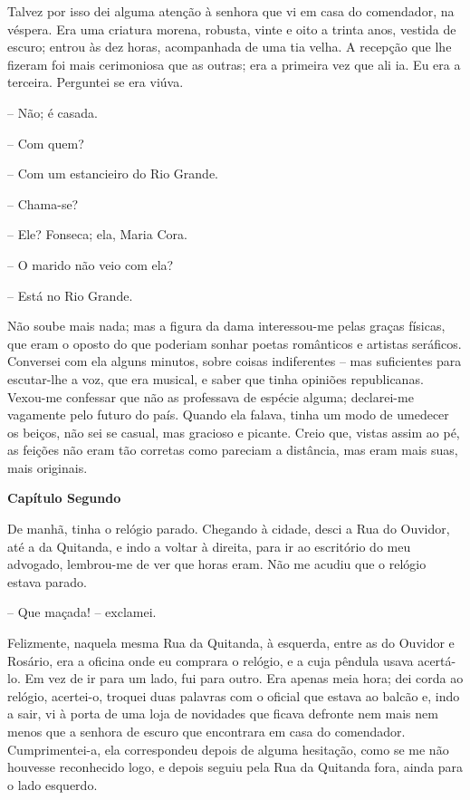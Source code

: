 Talvez por isso dei alguma atenção à senhora que vi em casa do
comendador, na véspera. Era uma criatura morena, robusta, vinte e oito a
trinta anos, vestida de escuro; entrou às dez horas, acompanhada de uma
tia velha. A recepção que lhe fizeram foi mais cerimoniosa que as
outras; era a primeira vez que ali ia. Eu era a terceira. Perguntei se
era viúva.

-- Não; é casada.

-- Com quem?

-- Com um estancieiro do Rio Grande.

-- Chama-se?

-- Ele? Fonseca; ela, Maria Cora.

-- O marido não veio com ela?

-- Está no Rio Grande.

Não soube mais nada; mas a figura da dama interessou-me pelas graças
físicas, que eram o oposto do que poderiam sonhar poetas românticos e
artistas seráficos. Conversei com ela alguns minutos, sobre coisas
indiferentes -- mas suficientes para escutar-lhe a voz, que era musical,
e saber que tinha opiniões republicanas. Vexou-me confessar que não as
professava de espécie alguma; declarei-me vagamente pelo futuro do país.
Quando ela falava, tinha um modo de umedecer os beiços, não sei se
casual, mas gracioso e picante. Creio que, vistas assim ao pé, as
feições não eram tão corretas como pareciam a distância, mas eram mais
suas, mais originais.

\textbf{Capítulo Segundo}

De manhã, tinha o relógio parado. Chegando à cidade, desci a Rua do
Ouvidor, até a da Quitanda, e indo a voltar à direita, para ir ao
escritório do meu advogado, lembrou-me de ver que horas eram. Não me
acudiu que o relógio estava parado.

-- Que maçada! -- exclamei.

Felizmente, naquela mesma Rua da Quitanda, à esquerda, entre as do
Ouvidor e Rosário, era a oficina onde eu comprara o relógio, e a cuja
pêndula usava acertá-lo. Em vez de ir para um lado, fui para outro. Era
apenas meia hora; dei corda ao relógio, acertei-o, troquei duas palavras
com o oficial que estava ao balcão e, indo a sair, vi à porta de uma
loja de novidades que ficava defronte nem mais nem menos que a senhora
de escuro que encontrara em casa do comendador. Cumprimentei-a, ela
correspondeu depois de alguma hesitação, como se me não houvesse
reconhecido logo, e depois seguiu pela Rua da Quitanda fora, ainda para
o lado esquerdo.


